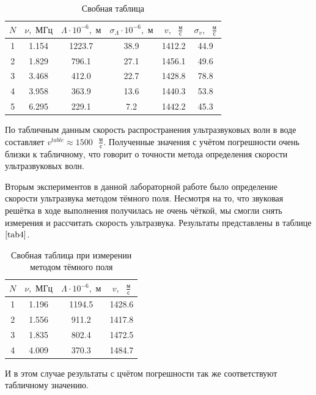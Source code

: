 \documentclass[a4paper,12pt]{article} %
\begin{document}
\begin{table}[h]
    \centering
    \begin{tabular}{|c|c|c|c|c|c|}
    \hline
    $N$ & $\nu, \text{ МГц}$ & $\Lambda\cdot10^{-6}, \text{ м}$ & $\sigma_{\Lambda}\cdot10^{-6}, \text{ м}$ & $v, \text{ }\frac{\text{м}}{\text{с}}$ & $\sigma_{v}, \text{ }\frac{\text{м}}{\text{с}}$ \\ \hline
    1 & 1.154 & 1223.7 & 38.9 & 1412.2 & 44.9 \\ \hline
    2 & 1.829 & 796.1 & 27.1 & 1456.1 & 49.6 \\ \hline
    3 & 3.468 & 412.0 & 22.7 & 1428.8 & 78.8 \\ \hline
    4 & 3.958 & 363.9 & 13.6 & 1440.3 & 53.8 \\ \hline
    5 & 6.295 & 229.1 & 7.2 & 1442.2 & 45.3 \\ \hline
    \end{tabular}
\caption{Свобная таблица}
\label{tab3}
\end{table}

По табличным данным скорость распространения ультразвуковых волн в воде составляет $v^{table}\approx1500\text{ }\frac{\text{м}}{\text{с}}$. Полученные значения с учётом погрешности очень близки к табличному, что говорит о точности метода определения скорости ультразвуковых волн.

Вторым экспериментов в данной лабораторной работе было определение скорости ультразвука методом тёмного поля. Несмотря на то, что звуковая решётка в ходе выполнения получилась не очень чёткой, мы смогли снять измерения и рассчитать скорость ультразвука. Результаты представлены в таблице $\ref{tab4}$.

\begin{table}[h]
    \centering
    \begin{tabular}{|c|c|c|c|}
    \hline
    $N$ & $\nu, \text{ МГц}$ & $\Lambda\cdot10^{-6}, \text{ м}$ & $v, \text{ }\frac{\text{м}}{\text{с}}$ \\ \hline
    1 & 1.196 & 1194.5 & 1428.6 \\ \hline
    2 & 1.556 & 911.2 & 1417.8 \\ \hline
    3 & 1.835 & 802.4 & 1472.5 \\ \hline
    4 & 4.009 & 370.3 & 1484.7 \\ \hline
    \end{tabular}
\caption{Свобная таблица при измерении методом тёмного поля}
\label{tab4}
\end{table}

И в этом случае результаты с цчётом погрешности так же соответствуют табличному значению.
\end{document}
